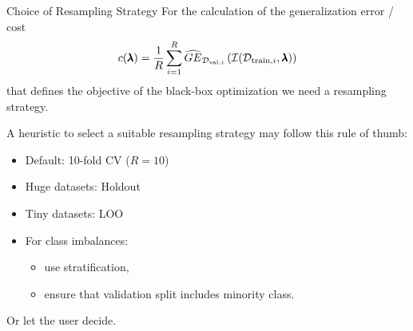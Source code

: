 \begin{frame}{Choice of Resampling Strategy}
  For the calculation of the generalization error / cost
  \begin{equation}
    c(\pmb{\lambda}) = \frac{1}{R}\sum_{i = 1}^R \widehat{GE}_{\mathcal{D}_{\text{val}, i}}\left(\mathcal{I}(\mathcal{D}_{\text{train}, i}, \pmb{\lambda})\right)
  \end{equation}
  that defines the objective of the black-box optimization we need a resampling strategy.

  \vspace{1em}

  A heuristic to select a suitable resampling strategy may follow this rule of thumb:
    \begin{itemize}
      \item Default: 10-fold CV ($R=10$)
      \item Huge datasets: Holdout
      \item Tiny datasets: LOO
      \item For class imbalances:
      \begin{itemize}
        \item use stratification,
        \item ensure that validation split includes minority class.
      \end{itemize}
    \end{itemize}
    Or let the user decide.
\end{frame}

